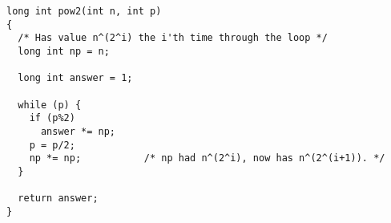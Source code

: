 \begin{verbatim}
long int pow2(int n, int p)
{
  /* Has value n^(2^i) the i'th time through the loop */
  long int np = n;

  long int answer = 1;
  
  while (p) {
    if (p%2)
      answer *= np;
    p = p/2;
    np *= np;			/* np had n^(2^i), now has n^(2^(i+1)). */
  }
    
  return answer;
}
\end{verbatim}
